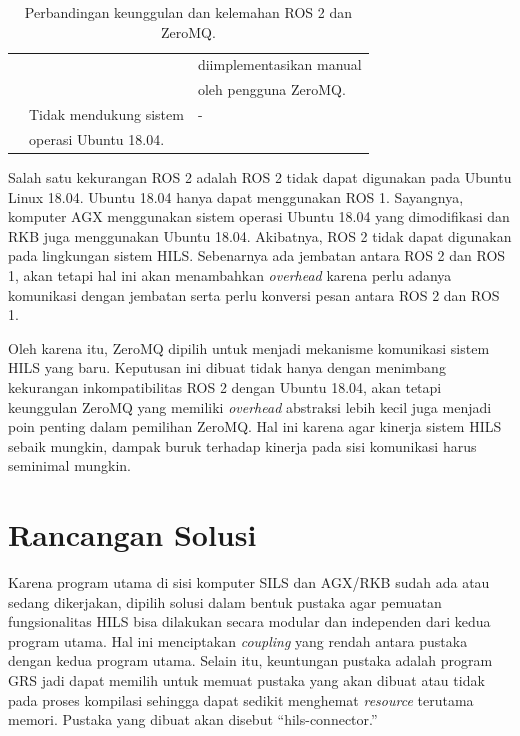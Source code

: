 \begin{table}[!htbp]
\begin{tabular}{| r | l | l |}
		                    &                                    & diimplementasikan manual                           \\
		                    &                                    & oleh pengguna ZeroMQ.                              \\
		\cline{2-3}
		                    & Tidak mendukung sistem             & -                                                  \\
		                    & operasi Ubuntu 18.04.              &                                                    \\
		\hline
	\end{tabular}
	\caption{Perbandingan keunggulan dan kelemahan ROS 2 dan ZeroMQ.}
	\label{chapter-3-tbl-ros2-vs-zmq}
\end{table}

Salah satu kekurangan ROS 2 adalah ROS 2 tidak dapat digunakan pada Ubuntu Linux
18.04. Ubuntu 18.04 hanya dapat menggunakan ROS 1. Sayangnya, komputer AGX
menggunakan sistem operasi Ubuntu 18.04 yang dimodifikasi dan RKB juga
menggunakan Ubuntu 18.04. Akibatnya, ROS 2 tidak dapat digunakan pada lingkungan
sistem HILS. Sebenarnya ada jembatan antara ROS 2 dan ROS 1, akan tetapi hal
ini akan menambahkan \textit{overhead} karena perlu adanya komunikasi dengan
jembatan serta perlu konversi pesan antara ROS 2 dan ROS 1.

Oleh karena itu, ZeroMQ dipilih untuk menjadi mekanisme komunikasi sistem HILS
yang baru. Keputusan ini dibuat tidak hanya dengan menimbang kekurangan
inkompatibilitas ROS 2 dengan Ubuntu 18.04, akan tetapi keunggulan ZeroMQ yang
memiliki \textit{overhead} abstraksi lebih kecil juga menjadi poin penting dalam
pemilihan ZeroMQ. Hal ini karena agar kinerja sistem HILS sebaik mungkin,
dampak buruk terhadap kinerja pada sisi komunikasi harus seminimal mungkin.

\section{Rancangan Solusi}

Karena program utama di sisi komputer SILS dan AGX/RKB sudah ada atau sedang
dikerjakan, dipilih solusi dalam bentuk pustaka agar pemuatan fungsionalitas
HILS bisa dilakukan secara modular dan independen dari kedua program utama.
Hal ini menciptakan \textit{coupling} yang rendah antara pustaka dengan kedua
program utama. Selain itu, keuntungan pustaka adalah program GRS jadi dapat
memilih untuk memuat pustaka yang akan dibuat atau tidak pada proses kompilasi
sehingga dapat sedikit menghemat \textit{resource} terutama memori. Pustaka yang
dibuat akan disebut ``hils-connector.''

